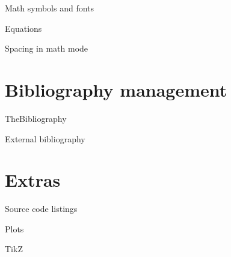 \documentclass[xetex, onlymath]{beamer}
\begin{document}
\begin{frame}{Math symbols and fonts}
\end{frame}

\begin{frame}{Equations}
\end{frame}

\begin{frame}{Spacing in math mode}
\end{frame}

\section{Bibliography management}
\begin{frame}{TheBibliography}
\end{frame}

\begin{frame}{External bibliography}
\end{frame}

\section{Extras}
\begin{frame}{Source code listings}
\end{frame}

\begin{frame}{Plots}
\end{frame}

\begin{frame}{TikZ}
\end{frame}
\end{document}
